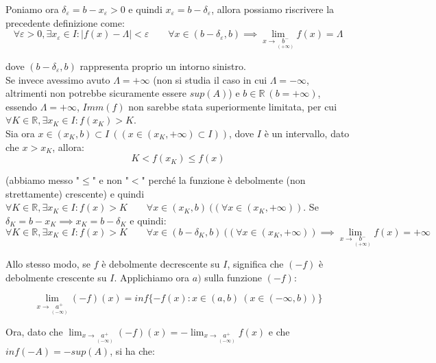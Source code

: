 \documentclass{article}
\begin{document}
\noindent Poniamo ora $\delta_\varepsilon = b - x_\varepsilon > 0$ e quindi $x_\varepsilon = b - \delta_\varepsilon$, allora possiamo riscrivere la precedente definizione come: 
\begin{equation*}
    \forall \varepsilon > 0, \exists x_\varepsilon \in I : |f(x) - \Lambda| < \varepsilon \qquad \forall x \in (b - \delta_\varepsilon, b) \implies \lim_{x \to \underset{\scriptstyle (+\infty)}{b^-}} f(x) = \Lambda
\end{equation*}

\noindent dove $(b - \delta_\varepsilon, b)$ rappresenta proprio un intorno sinistro.\\

\noindent Se invece avessimo avuto $\Lambda = +\infty$ (non si studia il caso in cui $\Lambda = -\infty$, altrimenti non potrebbe sicuramente essere $sup(A)$) e $b \in \mathbb{R} \ (b = +\infty)$, essendo $\Lambda = + \infty$, $Imm(f)$ non sarebbe stata superiormente limitata, per cui $\forall K \in \mathbb{R}, \exists x_K \in I : f(x_K) > K$.\\
Sia ora $x \in (x_K, b) \subset I \ ((x \in (x_K, +\infty) \subset I))$, dove $I$ è un intervallo, dato che $x > x_K$, allora: 
\begin{equation*}
    K < f(x_K) \leq f(x)
\end{equation*}

\noindent (abbiamo messo "$\leq$" e non "$<$" perché la funzione è debolmente (non strettamente) crescente) e quindi $\forall K \in \mathbb{R}, \exists x_K \in I : f(x) > K \qquad \forall x \in (x_K, b) \ ((\forall x \in (x_K, +\infty))$. Se $\delta_K = b - x_K \implies x_K = b - \delta_K$ e quindi: 
\begin{equation*}
    \forall K \in \mathbb{R}, \exists x_K \in I : f(x) > K \qquad \forall x \in (b - \delta_K, b) \ ((\forall x \in (x_K, +\infty)) \implies \lim_{x \to \underset{\scriptstyle (+\infty)}{b^-}} f(x) = +\infty
\end{equation*}

\noindent Allo stesso modo, se $f$ è debolmente decrescente su $I$, significa che $(-f)$ è debolmente crescente su $I$. Applichiamo ora $a)$ sulla funzione $(-f)$:

\begin{equation*}
    \lim_{x \to \underset{\scriptstyle (-\infty)}{a^+}} (-f)(x) = inf\{-f(x) : x \in (a, b) \ (x \in (-\infty, b))\}
\end{equation*}

\noindent Ora, dato che $\lim_{x \to \underset{\scriptstyle (-\infty)}{a^+}} (-f)(x) = - \lim_{x \to \underset{\scriptstyle (-\infty)}{a^+}} f(x)$ e che $inf(-A) = -sup(A)$, si ha che:
\end{document}
